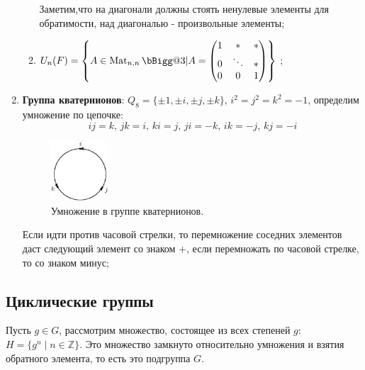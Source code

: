 \documentclass[12pt]{article}
\newcommand{\MZ}{\mathbb{Z}}
\theoremstyle{definition}
\newcommand{\mat}[2]{\operatorname{Mat}_{#1, #2}}
\begin{document}
\begin{enumerate}[label=\arabic*)]
\begin{enumerate}[label=(\arabic*)]
	 	Заметим,что на диагонали должны стоять ненулевые элементы для обратимости, над диагональю - произвольные элементы;
		\item $U_n(F) = \left\{A \in \mat{n}{n} \bBigg@{3}| A =
		\begin{pmatrix}
			1 & *  & * \\
			0 & \ddots & *\\
			0 & 0 & 1
		\end{pmatrix} \right\}$ ;
	\end{enumerate}
	\item \textbf{Группа кватернионов}: $Q_8 = \{\pm1, \pm i, \pm j, \pm k\}, \, i^2 = j^2 = k^2 = -1$, определим умножение по цепочке:
	$$
		ij = k, \, jk = i, \, ki = j,\, ji = -k, \, ik = -j, \, kj = -i
	$$
	\begin{figure}[H]
		\centering
		\includegraphics[width=0.2\textwidth]{AL1L24_2.eps}
		\caption{Умножение в группе кватернионов.}
		\label{24_2}
	\end{figure}
	Если идти против часовой стрелки, то перемножение соседних элементов даст следующий элемент со знаком $+$, если перемножать по часовой стрелке, то со знаком минус;
\end{enumerate}


\subsection*{Циклические группы}
Пусть $g \in G$, рассмотрим множество, состоящее из всех степеней $g$: $H = \{g^n \mid n \in \MZ\}$. Это множество замкнуто относительно умножения и взятия обратного элемента, то есть это подгруппа $G$.
\end{document}
